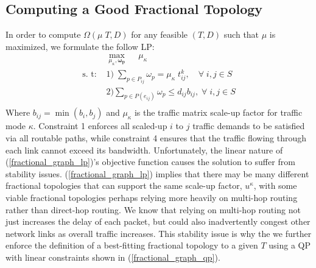 \documentclass[sigconf]{acmart}
\theoremstyle{definition}
\begin{document}
\begin{appendices}
\subsection{Computing a Good Fractional Topology}
In order to compute $\Omega(\mu \; T, D)$ for any feasible $(T, D)$ such that $\mu$ is maximized, we formulate the follow LP:
\begin{equation}
\begin{aligned}
 & \max\limits_{\mu_\kappa, \boldsymbol{\omega_p}} \; \quad \mu_{\kappa} \\
\text{s. t: } & 1) \; \sum_{p \in P_{ij}} \omega_{p} = \mu_{\kappa} \; t_{ij}^k, \quad \forall \; i, j \in S \\
& 2) \sum_{p \in P(e_{ij})} \omega_{p} \leq d_{ij} b_{ij}, \; \forall \; i, j \in S\\
\end{aligned}\label{fractional_graph_lp}
\end{equation}
Where $b_{ij} = \min(b_i, b_j)$ and $\mu_{\kappa}$ is the traffic matrix scale-up factor for traffic mode $\kappa$. Constraint 1 enforces all scaled-up $i$ to $j$ traffic demands to be satisfied via all routable paths, while constraint 4 ensures that the traffic flowing through each link cannot exceed its bandwidth. Unfortunately, the linear nature of (\ref{fractional_graph_lp})'s objective function causes the solution to suffer from stability issues. (\ref{fractional_graph_lp}) implies that there may be many different fractional topologies that can support the same scale-up factor, $u^\kappa$, with some viable fractional topologies perhaps relying more heavily on multi-hop routing rather than direct-hop routing. We know that relying on multi-hop routing not just increases the delay of each packet, but could also inadvertently congest other network links as overall traffic increases. This stability issue is why the we further enforce the definition of a best-fitting fractional topology to a given $T$ using a QP with linear constraints shown in (\ref{fractional_graph_qp}).


\end{appendices}
\end{document}
